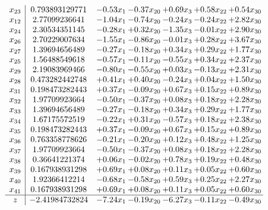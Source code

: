 \documentclass[8pt]{article}
\begin{document}
\[\begin{array}{c| c c@{\hskip 2pt} c@{\hskip 2pt} c@{\hskip 2pt} c@{\hskip 2pt} c@{\hskip 2pt} }
 x_{23}   &  0.793893129771 & -0.53 x_{1} & -0.37 x_{20} & +  0.69 x_{3} & +  0.58 x_{22} & +  0.54 x_{30}\\
 x_{12}   &  2.77099236641 & -1.04 x_{1} & -0.74 x_{20} & -0.24 x_{3} & -0.24 x_{22} & +  2.82 x_{30}\\
 x_{24}   &  2.30534351145 & -0.28 x_{1} & +  0.32 x_{20} & -1.35 x_{3} & -0.01 x_{22} & +  2.90 x_{30}\\
 x_{26}   &  2.70229007634 & -1.55 x_{1} & -0.86 x_{20} & -0.01 x_{3} & +  0.28 x_{22} & +  3.67 x_{30}\\
 x_{27}   &  1.39694656489 & -0.27 x_{1} & -0.18 x_{20} & +  0.34 x_{3} & +  0.29 x_{22} & +  1.77 x_{30}\\
 x_{25}   &  1.56488549618 & -0.57 x_{1} & -0.11 x_{20} & -0.55 x_{3} & +  0.34 x_{22} & +  2.37 x_{30}\\
 x_{29}   &  2.19083969466 & -0.80 x_{1} & -0.55 x_{20} & +  0.03 x_{3} & -0.13 x_{22} & +  2.31 x_{30}\\
 x_{28}   &  0.473282442748 & +  0.41 x_{1} & +  0.40 x_{20} & -0.24 x_{3} & +  0.04 x_{22} & +  1.50 x_{30}\\
 x_{31}   &  0.198473282443 & +  0.37 x_{1} & -0.09 x_{20} & +  0.67 x_{3} & +  0.15 x_{22} & +  0.89 x_{30}\\
 x_{32}   &  1.97709923664 & -0.50 x_{1} & -0.37 x_{20} & +  0.08 x_{3} & +  0.18 x_{22} & +  2.28 x_{30}\\
 x_{33}   &  1.39694656489 & -0.27 x_{1} & -0.18 x_{20} & +  0.34 x_{3} & +  0.29 x_{22} & +  1.77 x_{30}\\
 x_{34}   &  1.67175572519 & -0.22 x_{1} & +  0.31 x_{20} & -0.57 x_{3} & +  0.18 x_{22} & +  2.38 x_{30}\\
 x_{35}   &  0.198473282443 & +  0.37 x_{1} & -0.09 x_{20} & +  0.67 x_{3} & +  0.15 x_{22} & +  0.89 x_{30}\\
 x_{36}   &  0.763358778626 & -0.21 x_{1} & -0.20 x_{20} & +  0.12 x_{3} & +  0.48 x_{22} & +  1.25 x_{30}\\
 x_{37}   &  1.97709923664 & -0.50 x_{1} & -0.37 x_{20} & +  0.08 x_{3} & +  0.18 x_{22} & +  2.28 x_{30}\\
 x_{38}   &  0.36641221374 & +  0.06 x_{1} & -0.02 x_{20} & +  0.78 x_{3} & +  0.19 x_{22} & +  0.48 x_{30}\\
 x_{39}   &  0.167938931298 & +  0.69 x_{1} & +  0.08 x_{20} & +  0.11 x_{3} & +  0.05 x_{22} & +  0.60 x_{30}\\
 x_{40}   &  1.92366412214 & -0.68 x_{1} & -0.58 x_{20} & +  0.59 x_{3} & +  0.25 x_{22} & +  2.27 x_{30}\\
 x_{41}   &  0.167938931298 & +  0.69 x_{1} & +  0.08 x_{20} & +  0.11 x_{3} & +  0.05 x_{22} & +  0.60 x_{30}\\
\hline
z    &  -2.41984732824 & -7.24 x_{1} & -0.19 x_{20} & -6.27 x_{3} & -0.11 x_{22} & -0.49 x_{30}\\
\end{array}\]
\end{document}

